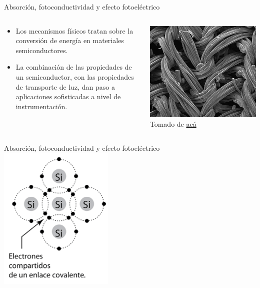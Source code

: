 \documentclass[aspectratio=169]{beamer}
\begin{document}
\begin{frame}{Absorción, fotoconductividad y efecto fotoeléctrico}
    \begin{columns}[c, onlytextwidth]
        \begin{column}{0.6\textwidth}
            \begin{itemize}
                \item Los mecanismos físicos tratan sobre la conversión de energía en materiales semiconductores.
                \item La combinación de las propiedades de un semiconductor, con las propiedades de transporte de luz, dan paso a aplicaciones sofisticadas a nivel de instrumentación.
            \end{itemize}
        \end{column}
        \begin{column}{0.40\textwidth}
            \centering
            \includegraphics[width = 0.9\linewidth]{fig/Optica/barrido electronico.jpg}\\
            \tiny{Tomado de \href{https://todoenpolimeros.com/2019/01/07/microscopio-electronico-de-barrido/}{acá}}
        \end{column}
    \end{columns}
\end{frame}

\begin{frame}{Absorción, fotoconductividad y efecto fotoeléctrico}
    \centering
    \includegraphics[width=5.5cm]{fig/Optica/Silicon.png}
\end{frame}
\end{document}
